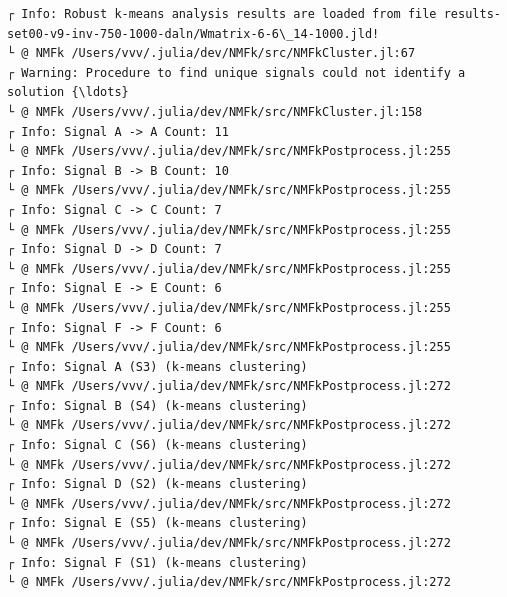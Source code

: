 \documentclass[11pt]{article}
\begin{document}
    \begin{Verbatim}[commandchars=\\\{\}]
┌ Info: Robust k-means analysis results are loaded from file results-
set00-v9-inv-750-1000-daln/Wmatrix-6-6\_14-1000.jld!
└ @ NMFk /Users/vvv/.julia/dev/NMFk/src/NMFkCluster.jl:67
┌ Warning: Procedure to find unique signals could not identify a solution {\ldots}
└ @ NMFk /Users/vvv/.julia/dev/NMFk/src/NMFkCluster.jl:158
┌ Info: Signal A -> A Count: 11
└ @ NMFk /Users/vvv/.julia/dev/NMFk/src/NMFkPostprocess.jl:255
┌ Info: Signal B -> B Count: 10
└ @ NMFk /Users/vvv/.julia/dev/NMFk/src/NMFkPostprocess.jl:255
┌ Info: Signal C -> C Count: 7
└ @ NMFk /Users/vvv/.julia/dev/NMFk/src/NMFkPostprocess.jl:255
┌ Info: Signal D -> D Count: 7
└ @ NMFk /Users/vvv/.julia/dev/NMFk/src/NMFkPostprocess.jl:255
┌ Info: Signal E -> E Count: 6
└ @ NMFk /Users/vvv/.julia/dev/NMFk/src/NMFkPostprocess.jl:255
┌ Info: Signal F -> F Count: 6
└ @ NMFk /Users/vvv/.julia/dev/NMFk/src/NMFkPostprocess.jl:255
┌ Info: Signal A (S3) (k-means clustering)
└ @ NMFk /Users/vvv/.julia/dev/NMFk/src/NMFkPostprocess.jl:272
┌ Info: Signal B (S4) (k-means clustering)
└ @ NMFk /Users/vvv/.julia/dev/NMFk/src/NMFkPostprocess.jl:272
┌ Info: Signal C (S6) (k-means clustering)
└ @ NMFk /Users/vvv/.julia/dev/NMFk/src/NMFkPostprocess.jl:272
┌ Info: Signal D (S2) (k-means clustering)
└ @ NMFk /Users/vvv/.julia/dev/NMFk/src/NMFkPostprocess.jl:272
┌ Info: Signal E (S5) (k-means clustering)
└ @ NMFk /Users/vvv/.julia/dev/NMFk/src/NMFkPostprocess.jl:272
┌ Info: Signal F (S1) (k-means clustering)
└ @ NMFk /Users/vvv/.julia/dev/NMFk/src/NMFkPostprocess.jl:272
    \end{Verbatim}

    \begin{center}
    \end{center}
    { \hspace*{\fill} \\}
    
    \begin{Verbatim}[commandchars=\\\{\}]

    \end{Verbatim}

    \begin{center}
    \end{center}
    { \hspace*{\fill} \\}
    
\end{document}
